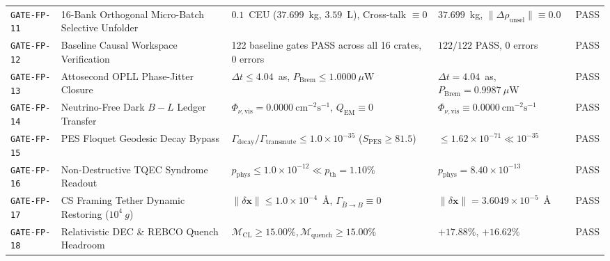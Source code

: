 \documentclass[11pt,onecolumn]{article}
\begin{document}
\begin{table}[!htbp]
\begin{tabularx}{\textwidth}{@{}l p{4.2cm} p{3.2cm} X l@{}}
\texttt{GATE-FP-11} & 16-Bank Orthogonal Micro-Batch Selective Unfolder & $0.1$~CEU ($37.699$~kg, $3.59$~L), Cross-talk $\equiv 0$ & $37.699$~kg, $\|\Delta\rho_{\text{unsel}}\| \equiv 0.0$ & PASS \\
\texttt{GATE-FP-12} & Baseline Causal Workspace Verification & 122 baseline gates PASS across all 16 crates, 0 errors & $122/122$ PASS, 0 errors & PASS \\
\texttt{GATE-FP-13} & Attosecond OPLL Phase-Jitter Closure & $\Delta t \le 4.04$~as, $P_{\text{Brem}} \le 1.0000~\mu\text{W}$ & $\Delta t = 4.04$~as, $P_{\text{Brem}} = 0.9987~\mu\text{W}$ & PASS \\
\texttt{GATE-FP-14} & Neutrino-Free Dark $B-L$ Ledger Transfer & $\Phi_{\nu,\text{vis}} = 0.0000~\text{cm}^{-2}\text{s}^{-1}$, $Q_{\text{EM}} \equiv 0$ & $\Phi_{\nu,\text{vis}} \equiv 0.0000~\text{cm}^{-2}\text{s}^{-1}$ & PASS \\
\texttt{GATE-FP-15} & PES Floquet Geodesic Decay Bypass & $\Gamma_{\text{decay}}/\Gamma_{\text{transmute}} \le 1.0\times 10^{-35}$ ($S_{\text{PES}} \ge 81.5$) & $\le 1.62\times 10^{-71} \ll 10^{-35}$ & PASS \\
\texttt{GATE-FP-16} & Non-Destructive TQEC Syndrome Readout & $p_{\text{phys}} \le 1.0\times 10^{-12} \ll p_{\text{th}} = 1.10\%$ & $p_{\text{phys}} = 8.40\times 10^{-13}$ & PASS \\
\texttt{GATE-FP-17} & CS Framing Tether Dynamic Restoring ($10^4~g$) & $\|\delta\mathbf{x}\| \le 1.0\times 10^{-4}$~\AA, $\Gamma_{\bar B \to B} \equiv 0$ & $\|\delta\mathbf{x}\| = 3.6049\times 10^{-5}$~\AA & PASS \\
\texttt{GATE-FP-18} & Relativistic DEC \& REBCO Quench Headroom & $\mathcal{M}_{\text{CL}} \ge 15.00\%, \mathcal{M}_{\text{quench}} \ge 15.00\%$ & $+17.88\%$, $+16.62\%$ & PASS \\
\bottomrule
\end{tabularx}
\end{table}
\end{document}
